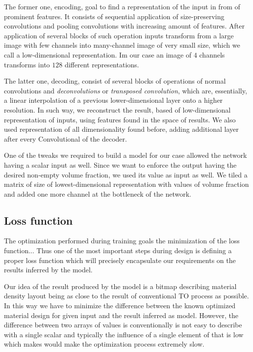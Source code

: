 The former one, encoding, goal to find a representation of the input in from of prominent features.
It consists of sequential application of  size-preserving convolutions and pooling convolutions with increasing amount of features. 
After application of several blocks of such operation inputs transform from a large image with few channels into many-channel image of very small size, which we call a low-dimensional representation. 
Im our case an image of $4$ channels transforms into $128$ different representations. 

The latter one, decoding, consist of several blocks of operations of normal convolutions and \textit{deconvolutions} or \textit{transposed convolution}, which are, essentially, a linear interpolation of a previous lower-dimensional layer onto a higher resolution.
In such way, we reconstruct the result, based of low-dimensional representation of inputs, using features found in the space of results.
We also used representation of all dimensionality found before, adding additional layer after every Convolutional of the decoder.

One of the tweaks we required to build a model for our case allowed the network having a scalar input as well.
Since we want to enforce the output having the desired non-empty volume fraction, we used its value as input as well.
We tiled a matrix of size of lowest-dimensional representation with values of volume fraction and added one more channel at the bottleneck of the network. 


\subsection{Loss function}

The optimization performed during training goals the minimization of the loss function...
Thus one of the most important steps during design is defining a proper loss function which will precisely encapsulate our requirements on the results inferred by the model.
\medskip

Our idea of the result produced by the model is a bitmap describing material density layout being as close to the result of conventional TO process as possible.
In this way we have to minimize the difference between the known optimized material design for given input and the result inferred as model.
However, the difference between two arrays of values is conventionally is not easy to describe with a single scalar and typically the influence of a single element of that is low which makes would make the optimization process extremely slow.
\medskip

